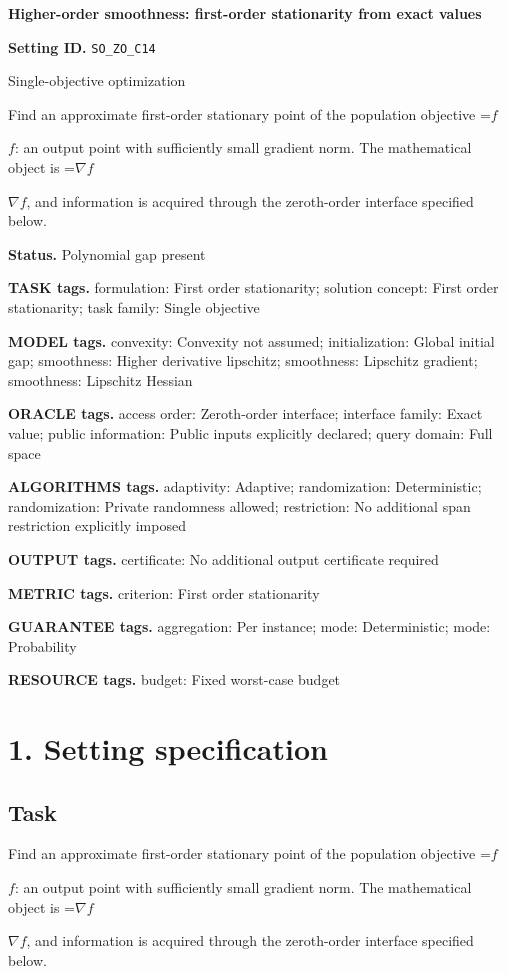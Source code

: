 \documentclass[10pt,a4paper]{article}
\newcommand{\AtlasMath}[1]{\par\begingroup\centering\setbox0=\hbox{$\displaystyle #1$}\ifdim\wd0>1.4\linewidth\typeout{ATLAS WIDE FORMULA: \the\wd0}\fi\ifdim\wd0>\linewidth\resizebox{\linewidth}{!}{\box0}\else\box0\fi\par\endgroup}
\newcommand{\AtlasInlineMath}[1]{\begingroup\setbox0=\hbox{$#1$}\ifdim\wd0>.4\linewidth\endgroup\AtlasMath{#1}\else\endgroup$#1$\fi}
\begin{document}
\raggedright

{\LARGE\bfseries\sffamily\color{AtlasNavy} Higher-order smoothness: first-order stationarity from exact values\par}\vspace{5pt}
\textbf{Setting ID.} \texttt{SO\_\allowbreak{}ZO\_\allowbreak{}C14}

Single-objective optimization

Find an approximate first-order stationary point of the population objective \AtlasInlineMath{f}: an output point with sufficiently small gradient norm. The mathematical object is \AtlasInlineMath{\nabla f}, and information is acquired through the zeroth-order interface specified below.

\textbf{Status.} Polynomial gap present

\textbf{TASK tags.} formulation: First order stationarity; solution concept: First order stationarity; task family: Single objective

\textbf{MODEL tags.} convexity: Convexity not assumed; initialization: Global initial gap; smoothness: Higher derivative lipschitz; smoothness: Lipschitz gradient; smoothness: Lipschitz Hessian

\textbf{ORACLE tags.} access order: Zeroth-order interface; interface family: Exact value; public information: Public inputs explicitly declared; query domain: Full space

\textbf{ALGORITHMS tags.} adaptivity: Adaptive; randomization: Deterministic; randomization: Private randomness allowed; restriction: No additional span restriction explicitly imposed

\textbf{OUTPUT tags.} certificate: No additional output certificate required

\textbf{METRIC tags.} criterion: First order stationarity

\textbf{GUARANTEE tags.} aggregation: Per instance; mode: Deterministic; mode: Probability

\textbf{RESOURCE tags.} budget: Fixed worst-case budget

\section{1. Setting specification}
\subsection{Task}
Find an approximate first-order stationary point of the population objective \AtlasInlineMath{f}: an output point with sufficiently small gradient norm. The mathematical object is \AtlasInlineMath{\nabla f}, and information is acquired through the zeroth-order interface specified below.
\end{document}
